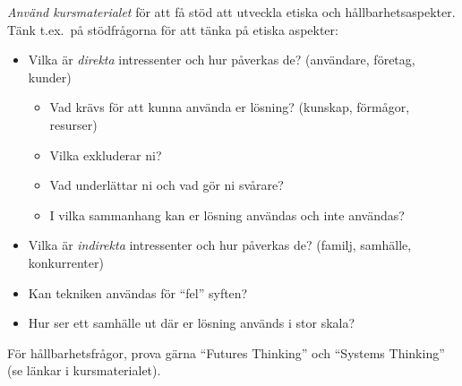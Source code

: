 \emph{Använd kursmaterialet} för att få stöd att utveckla etiska och hållbarhetsaspekter.
Tänk t.ex.~på stödfrågorna för att tänka på etiska aspekter:
\begin{itemize}
\item Vilka är \emph{direkta} intressenter och hur påverkas de? (användare, företag, kunder)
\begin{itemize}
\item  Vad krävs för att kunna använda er lösning? (kunskap, förmågor, resurser)
\item  Vilka exkluderar ni?
\item  Vad underlättar ni och vad gör ni svårare?
\item  I vilka sammanhang kan er lösning användas och inte användas?
\end{itemize}
\item  Vilka är \emph{indirekta} intressenter och hur påverkas de? (familj, samhälle, konkurrenter)
\item  Kan tekniken användas för ``fel'' syften?
\item  Hur ser ett samhälle ut där er lösning används i stor skala?
\end{itemize}

För hållbarhetsfrågor, prova gärna ``Futures Thinking'' och ``Systems Thinking'' (se länkar i kursmaterialet).

